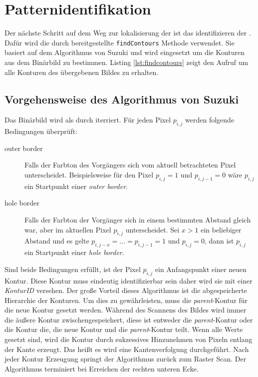 \chapter{Patternidentifikation}
Der nächste Schritt auf dem Weg zur lokalisierung der \QRCodes ist das identifizieren der \fps. Dafür wird die durch \OpenCV bereitgestellte \texttt{findContours} Methode verwendet. Sie basiert auf dem Algorithmus von Suzuki und wird eingesetzt um die Konturen aus dem Binärbild zu bestimmen.
Listing \ref{lst:findcontours} zeigt den Aufruf um alle Konturen des übergebenen Bildes zu erhalten.

\section{Vorgehensweise des Algorithmus von Suzuki} \label{suzuki}
Das Binärbild wird als durch iterriert. Für jeden Pixel $p_{i,j}$ werden folgende Bedingungen überprüft:
\begin{description}
	\item[outer border] Falls der Farbton des Vorgängers sich vom aktuell betrachteten Pixel unterscheidet. Beispielsweise für den Pixel $p_{i,j} = 1$ und $p_{i,j-1} = 0$ wäre $p_{i,j}$ ein Startpunkt einer \emph{outer border}. 
	\item[hole border] Falls der Farbton der Vorgänger sich in einem bestimmten Abstand gleich war, aber im aktuellen Pixel $p_{i,j}$ unterscheidet. Sei $x > 1$ ein beliebiger Abstand und es gelte $p_{i,j-x} =\ldots = p_{i,j-1}= 1$ und $p_{i,j} = 0$, dann ist $p_{i,j}$ ein Startpunkt einer \emph{hole border}.
\end{description}
Sind beide Bedingungen erfüllt, ist der Pixel $p_{i,j}$ ein Anfangspunkt einer neuen Kontur. Diese Kontur muss eindeutig identifizierbar sein daher wird sie mit einer \emph{KonturID} versehen. Der große Vorteil dieses Algorithmus ist die abgespeicherte Hierarchie der Konturen. Um dies zu gewährleisten, muss die \emph{parent}-Kontur für die neue Kontur gesetzt werden. Während des Scannens des Bildes wird immer die äußere Kontur zwischengespeichert, diese ist entweder die \emph{parent}-Kontur oder die Kontur die, die neue Kontur und die \emph{parent}-Kontur teilt. Wenn alle Werte gesetzt sind, wird die Kontur durch sukzessives Hinzunehmen von Pixeln entlang der Kante erzeugt. Das heißt es wird eine Kantenverfolgung durchgeführt. Nach jeder Kontur Erzeugung springt der Algorithmus zurück zum Raster Scan. Der Algorithmus terminiert bei Erreichen der rechten unteren Ecke.


